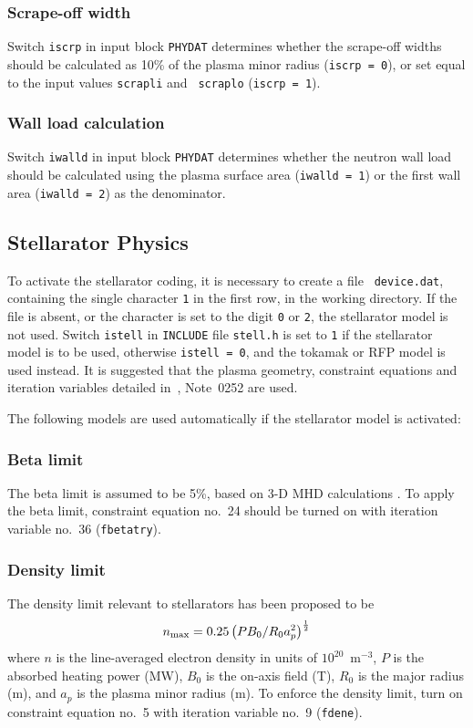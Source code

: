 \subsubsection{Scrape-off width}

Switch {\tt iscrp} in input block {\tt PHYDAT} determines whether the
scrape-off widths should be calculated as 10\% of the plasma minor radius
({\tt iscrp = 0}), or set equal to the input values {\tt scrapli} and {\tt
scraplo} ({\tt iscrp = 1}).

\subsubsection{Wall load calculation}

Switch {\tt iwalld} in input block {\tt PHYDAT} determines whether the neutron
wall load should be calculated using the plasma surface area ({\tt iwalld =
1}) or the first wall area ({\tt iwalld = 2}) as the denominator.

\subsection{Stellarator Physics}

To activate the stellarator coding, it is necessary to create a file {\tt
device.dat}, containing the single character {\tt 1} in the first row, in the
working directory. If the file is absent, or the character is set to the digit
{\tt 0} or {\tt 2}, the stellarator model is not used. Switch {\tt istell} in
{\tt INCLUDE} file {\tt stell.h} is set to {\tt 1} if the stellarator model is
to be used, otherwise {\tt istell = 0}, and the tokamak or RFP model is used
instead.  It is suggested that the plasma geometry, constraint equations and
iteration variables detailed in~\cite{PWF}, Note~0252 are used.
\setlength{\parskip}{5mm}

The following models are used automatically if the stellarator model is
activated:
\setlength{\parskip}{0mm}

\subsubsection{Beta limit}
The beta limit is assumed to be 5\%, based on 3-D MHD calculations
\cite{Nuhrenberg}. To apply the beta limit, constraint equation no.\ 24 should
be turned on with iteration variable no.\ 36 ({\tt fbetatry}).

\subsubsection{Density limit}
The density limit relevant to stellarators has been proposed to be~\cite{LHD}
\begin{equation}
n_{\mbox{\scriptsize max}} = 0.25\left( P B_0 / R_0 a_p^2\right)^\frac{1}{2}
\end{equation}
where $n$ is the line-averaged electron density in units of
$10^{20}$~m$^{-3}$, $P$ is the absorbed heating power (MW), $B_0$ is the
on-axis field (T), $R_0$ is the major radius (m), and $a_p$ is the plasma
minor radius (m). To enforce the density limit, turn on constraint equation
no.\ 5 with iteration variable no.\ 9 ({\tt fdene}).

